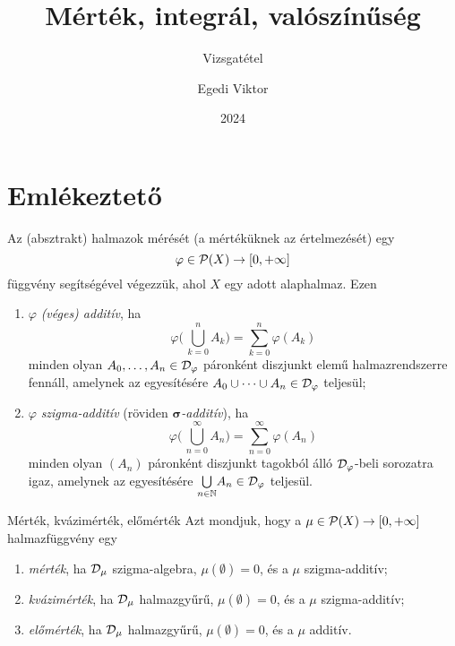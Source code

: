 \documentclass[
]{elteikthesis}[2024/04/26]
\title{Mérték, integrál, valószínűség} %
\subtitle{\circled{6} Vizsgatétel}
\date{2024} %
\author{Egedi Viktor}
\affiliation{egyetemi tanár} %
\begin{document}
	
	
	\section{Emlékeztető}
	
	Az (absztrakt) halmazok mérését (a mértéküknek az értelmezését) egy
	\[
		\varphi \in \mathcal{P}( X ) \to [0, +\infty]
	\]
	függvény segítségével végezzük, ahol \( X \) egy adott alaphalmaz. Ezen
	\begin{enumerate}
		\item \( \varphi \) \emph{(véges) additív}, ha
		\[
			\varphi \Biggl(\, \bigcup_{k=0}^n A_k \Biggr) = \sum_{k=0}^n \varphi(A_k)
		\]
		minden olyan \( A_0, \dots, A_n \in \mathcal{D}_{\varphi} \) páronként diszjunkt elemű halmazrendszerre fennáll, amelynek az egyesítésére
		\( A_0 \cup \cdots \cup A_n \in \mathcal{D}_{\varphi} \) teljesül;
		
		\item \( \varphi \) \emph{szigma-additív} 
		(röviden \emph{\( \boldsymbol{\sigma} \)-additív}), ha
		\[
			\varphi \Biggl(\, \bigcup_{n=0}^\infty A_n \Biggr) = 
			\sum_{n=0}^\infty \varphi(A_n)
		\]
		minden olyan \( (A_n) \) páronként diszjunkt tagokból álló 
		\( \mathcal{D}_{\varphi} \)-beli sorozatra igaz, amelynek az egyesítésére 
		\( \bigcup\limits_{n \in \mathbb{N}} \! A_n \in \mathcal{D}_{\varphi} \) teljesül.
	\end{enumerate}
	
	\begin{definition}{Mérték, kvázimérték, előmérték}{}
		Azt mondjuk, hogy a \( \mu \in \mathcal{P}( X ) \to [0, +\infty] \) halmazfüggvény egy
		\begin{enumerate}
			\item \emph{mérték}, ha \( \mathcal{D}_{\mu} \) szigma-algebra, \( \mu(\emptyset) = 0 \), és a \( \mu \) szigma-additív;
			
			\item \emph{kvázimérték}, ha \( \mathcal{D}_{\mu} \) halmazgyűrű, 
			\( \mu(\emptyset) = 0 \), és a \( \mu \) szigma-additív;
			
			\item \emph{előmérték}, ha \( \mathcal{D}_{\mu} \) halmazgyűrű, 
			\( \mu(\emptyset) = 0 \), és a \( \mu \) additív.
		\end{enumerate}
	\end{definition}
	
\end{document}
